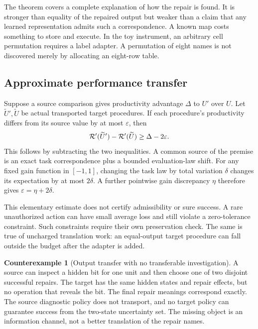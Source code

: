 \documentclass[11pt,letterpaper]{article}
\theoremstyle{plain}
\theoremstyle{definition}
\newtheorem{counterexample}[theorem]{Counterexample}
\begin{document}
The theorem covers a complete explanation of how the repair is found. It is stronger than equality of the repaired output but weaker than a claim that any learned representation admits such a correspondence. A known map costs something to store and execute. In the toy instrument, an arbitrary cell permutation requires a label adapter. A permutation of eight names is not discovered merely by allocating an eight-row table.

\subsection{Approximate performance transfer}
Suppose a source comparison gives productivity advantage $\Delta$ to $U'$ over $U$. Let $\widetilde U',\widetilde U$ be actual transported target procedures. If each procedure's productivity differs from its source value by at most $\varepsilon$, then
\begin{equation}\label{eq:gaintransport}
\mathcal R'(\widetilde U')-\mathcal R'(\widetilde U)
\geq\Delta-2\varepsilon.
\end{equation}
This follows by subtracting the two inequalities. A common source of the premise is an exact task correspondence plus a bounded evaluation-law shift. For any fixed gain function in $[-1,1]$, changing the task law by total variation $\delta$ changes its expectation by at most $2\delta$. A further pointwise gain discrepancy $\eta$ therefore gives $\varepsilon=\eta+2\delta$.

This elementary estimate does not certify admissibility or sure success. A rare unauthorized action can have small average loss and still violate a zero-tolerance constraint. Such constraints require their own preservation check. The same is true of uncharged translation work: an equal-output target procedure can fall outside the budget after the adapter is added.

\begin{counterexample}[Output transfer with no transferable investigation]\label{ex:unavailable}
A source can inspect a hidden bit for one unit and then choose one of two disjoint successful repairs. The target has the same hidden states and repair effects, but no operation that reveals the bit. The final repair meanings correspond exactly. The source diagnostic policy does not transport, and no target policy can guarantee success from the two-state uncertainty set. The missing object is an information channel, not a better translation of the repair names.
\end{counterexample}
\end{document}
